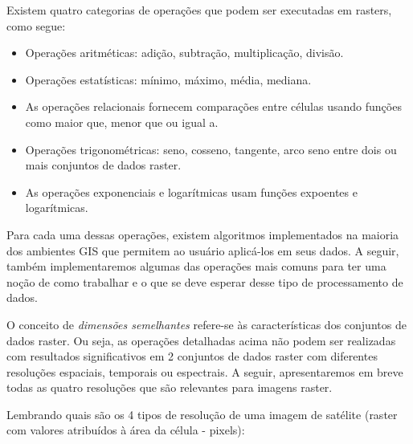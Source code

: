 \documentclass[
]{krantz}
\providecommand{\tightlist}{%
  \setlength{\itemsep}{0pt}\setlength{\parskip}{0pt}}
\begin{document}
Existem quatro categorias de operações que podem ser executadas em rasters, como segue:

\begin{itemize}
\tightlist
\item
  Operações aritméticas: adição, subtração, multiplicação, divisão.
\item
  Operações estatísticas: mínimo, máximo, média, mediana.
\item
  As operações relacionais fornecem comparações entre células usando funções como maior que, menor que ou igual a.
\item
  Operações trigonométricas: seno, cosseno, tangente, arco seno entre dois ou mais conjuntos de dados raster.
\item
  As operações exponenciais e logarítmicas usam funções expoentes e logarítmicas.
\end{itemize}

Para cada uma dessas operações, existem algoritmos implementados na maioria dos ambientes GIS que permitem ao usuário aplicá-los em seus dados. A seguir, também implementaremos algumas das operações mais comuns para ter uma noção de como trabalhar e o que se deve esperar desse tipo de processamento de dados.

O conceito de \emph{dimensões semelhantes} refere-se às características dos conjuntos de dados raster. Ou seja, as operações detalhadas acima não podem ser realizadas com resultados significativos em 2 conjuntos de dados raster com diferentes resoluções espaciais, temporais ou espectrais. A seguir, apresentaremos em breve todas as quatro resoluções que são relevantes para imagens raster.

Lembrando quais são os 4 tipos de resolução de uma imagem de satélite (raster com valores atribuídos à área da célula - pixels):
\end{document}
